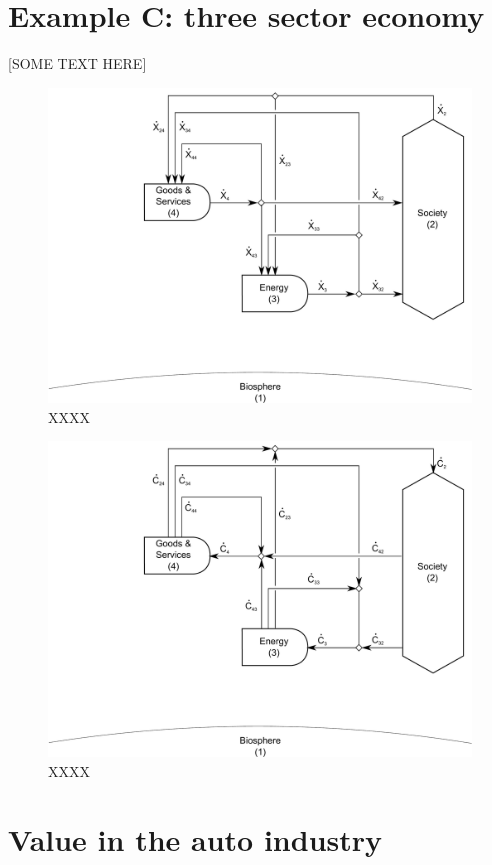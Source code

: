 \section{Example C: three sector economy}

[SOME TEXT HERE]

\begin{figure}[h!]
\centering
\includegraphics[width=0.8\linewidth]{Part_3/Chapter_Values/images/3_sector_value.pdf}
\caption{XXXX}
\label{fig:C_value}
\end{figure}

\begin{figure}[h!]
\centering
\includegraphics[width=0.8\linewidth]{Part_3/Chapter_Values/images/3_sector_cash.pdf}
\caption{XXXX}
\label{fig:C_cash}
\end{figure}

\section{Value in the auto industry}
\label{sec:value_auto}

